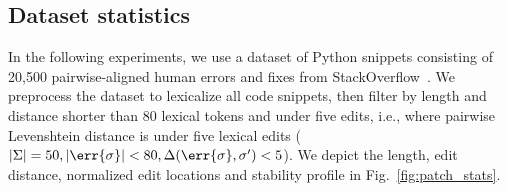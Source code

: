 \documentclass[runningheads]{llncs}
\begin{document}
  \subsection{Dataset statistics}\label{sec:rq1}

  In the following experiments, we use a dataset of Python snippets consisting of 20,500 pairwise-aligned human errors and fixes from StackOverflow~\cite{wong2019syntax}. We preprocess the dataset to lexicalize all code snippets, then filter by length and distance shorter than 80 lexical tokens and under five edits, i.e., where pairwise Levenshtein distance is under five lexical edits ($|\Sigma| = 50, |\err{\sigma}| < 80, \Delta(\err{\sigma}, \sigma') < 5$). We depict the length, edit distance, normalized edit locations and stability profile in Fig.~\ref{fig:patch_stats}.
\end{document}
